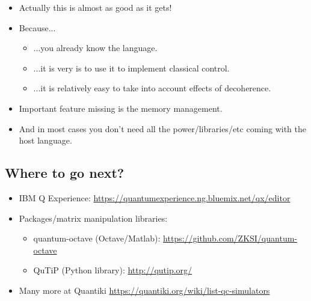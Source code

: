 \documentclass{beamer}
\begin{document}
\begin{frame}{\insertsection}{\insertsubsection}
    \begin{itemize}
        \item<1-> Actually this is almost as good as it gets!
        \item<2-> Because...
        \begin{itemize}
            \item<3->  ...you already know the language.
            \item<4-> ...it is very is to use it to implement 
            classical control.
            \item<5-> ...it is relatively easy to take into account effects of 
            decoherence.
        \end{itemize}
        \item<6-> Important feature missing is the memory management.
        \item<7-> And in most cases you don't need all the power/libraries/etc 
        coming with the host language.
    \end{itemize}
\end{frame}

\subsection{Where to go next?}
\begin{frame}{\insertsection}{\insertsubsection}
    \begin{itemize}
    \item<1-> IBM Q Experience: 
    {\small\url{https://quantumexperience.ng.bluemix.net/qx/editor}}
    \item<2-> Packages/matrix manipulation libraries:
    \begin{itemize}
        \item<3-> quantum-octave (Octave/Matlab): 
        {\small \url{https://github.com/ZKSI/quantum-octave}}
        \item<4-> QuTiP (Python library): {\small\url{http://qutip.org/}}
    \end{itemize}
    \item<6-> Many more at Quantiki 
    \url{https://quantiki.org/wiki/list-qc-simulators}
    \end{itemize}
\end{frame}
\end{document}
